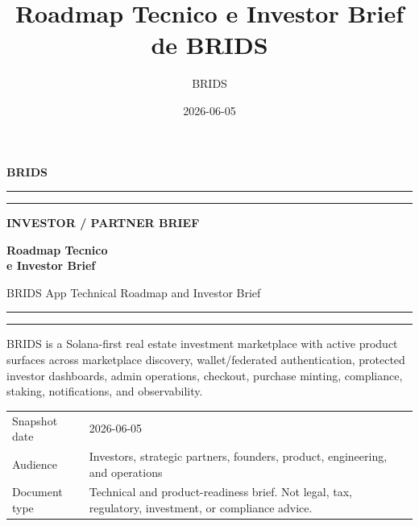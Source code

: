 \documentclass[
  10pt,
  letterpaper,
]{article}
\title{Roadmap Tecnico e Investor Brief de BRIDS}
\author{BRIDS}
\date{2026-06-05}
\newcommand{\bridskicker}[1]{{\small\bfseries\color{BridsBlue}\MakeUppercase{#1}}}
\renewcommand{\maketitle}{}
\begin{document}
\maketitle

\begin{titlepage}
\thispagestyle{empty}
\pagecolor{BridsInk}
\color{white}
\vspace*{0.35in}

{\fontsize{24}{28}\selectfont\bfseries BRIDS\par}
{\color{BridsBlue}\rule{0.42in}{2pt}}{\color{BridsViolet}\rule{0.42in}{2pt}}

\vspace{0.65in}
{\bridskicker{Investor / Partner Brief}\par}
\vspace{0.16in}
{\fontsize{30}{34}\selectfont\bfseries Roadmap Tecnico\\e Investor Brief\par}
\vspace{0.08in}
{\fontsize{16}{19}\selectfont BRIDS App Technical Roadmap and Investor Brief\par}

\vspace{0.18in}
{\color{BridsBlue}\rule{0.22\linewidth}{2.2pt}}{\color{BridsViolet}\rule{0.46\linewidth}{2.2pt}}

\vfill
\begin{minipage}{0.78\linewidth}
{\fontsize{12}{16}\selectfont
BRIDS is a Solana-first real estate investment marketplace with active product surfaces across marketplace discovery, wallet/federated authentication, protected investor dashboards, admin operations, checkout, purchase minting, compliance, staking, notifications, and observability.
\par}
\end{minipage}

\vfill
\begin{tabular}{@{}p{1.65in}p{4.4in}@{}}
\textcolor{BridsMuted}{Snapshot date} & 2026-06-05 \\
\textcolor{BridsMuted}{Audience} & Investors, strategic partners, founders, product, engineering, and operations \\
\textcolor{BridsMuted}{Document type} & Technical and product-readiness brief. Not legal, tax, regulatory, investment, or compliance advice. \\
\end{tabular}

\vspace*{0.3in}
\end{titlepage}
\nopagecolor
\color{BridsInk}
\clearpage
\end{document}
